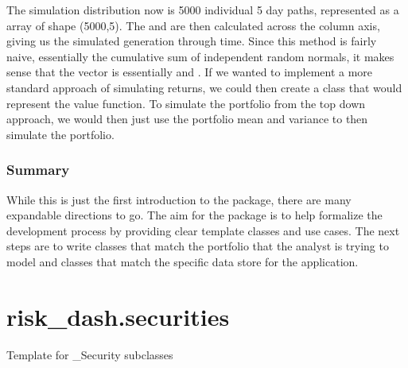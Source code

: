 \documentclass[letterpaper,10pt,english]{sphinxmanual}
\begin{document}
The simulation distribution now is 5000 individual 5 day paths,
represented as a  array of shape (5000,5). The
 and  are then calculated across
the column axis, giving us the simulated generation through time. Since
this method is fairly naive, essentially the cumulative sum of
independent random normals, it makes sense that the 
vector is essentially  and
. If we wanted to implement a
more standard approach of simulating returns, we could then create a
 class that would represent the value function. To
simulate the portfolio from the top down approach, we would then just
use the portfolio mean and variance to then simulate the portfolio.


\subsection{Summary}
\label{\detokenize{gettingstarted:summary}}
While this is just the first introduction to the package, there are many
expandable directions to go. The aim for the package is to help
formalize the development process by providing clear template classes
and use cases. The next steps are to write  classes that
match the portfolio that the analyst is trying to model and
 classes that match the specific data store for the
application.


\chapter{risk\_dash.securities}
\label{\detokenize{securities:module-risk_dash.securities}}\label{\detokenize{securities:risk-dash-securities}}\label{\detokenize{securities:securities}}\label{\detokenize{securities::doc}}

\begin{fulllineitems}
\label{\detokenize{securities:risk_dash.securities._Security}}
Template for \_Security subclasses

\end{fulllineitems}
\end{document}
